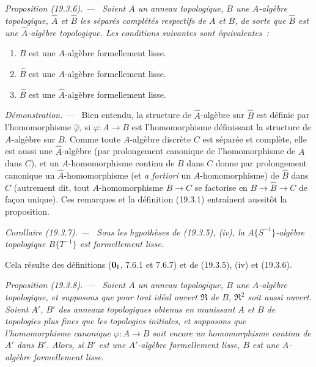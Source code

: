\documentclass[10pt,oneside]{book}
\makeatletter
\newcommand{\setmanualcurrentlabel}[1]{\def\@currentlabel{#1}}
\newcommand{\oldpage}[2][]{%
  \setcounter{footnote}{0}%
  \marginpar{\scriptsize\textbf{#1}~|~#2}\ignorespaces}
\newenvironment{proposition}[1][]{%
  \setmanualcurrentlabel{#1}\par\medskip\noindent\itshape Proposition (#1). ---\ }{\par}
\newenvironment{corollary}[1][]{%
  \setmanualcurrentlabel{#1}\par\medskip\noindent\itshape Corollaire (#1). ---\ }{\par}
\newenvironment{proof}{%
  \par\medskip\noindent\textit{Démonstration. ---\ }}{\par}
\makeatother
\begin{document}
\oldpage[0\textsubscript{IV-1}]{83}

\begin{proposition}[19.3.6]
\label{0.19.3.6-fr}
Soient $A$ un anneau topologique, $B$ une $A$-algèbre topologique, $\hat A$
et $\hat B$ les séparés complétés respectifs de $A$ et $B$, de sorte que
$\hat B$ est une $\hat A$-algèbre topologique. Les conditions suivantes
sont équivalentes~:
\begin{enumerate}
  \item[a)] $B$ est une $A$-algèbre formellement lisse.
  \item[b)] $\hat B$ est une $A$-algèbre formellement lisse.
  \item[c)] $\hat B$ est une $\hat A$-algèbre formellement lisse.
\end{enumerate}
\end{proposition}

\begin{proof}
Bien entendu, la structure de $\hat A$-algèbre sur $\hat B$ est définie
par l'homomorphisme $\hat\varphi$, si $\varphi:A\to B$ est
l'homomorphisme définissant la structure de $A$-algèbre sur $B$. Comme toute
$A$-algèbre discrète $C$ est séparée et complète, elle est aussi une
$\hat A$-algèbre (par prolongement canonique de l'homomorphisme de $A$ dans
$C$), et un $A$-homomorphisme continu de $B$ dans $C$ donne par prolongement
canonique un $\hat A$-homomorphisme (et \emph{a fortiori} un
$A$-homomorphisme) de $\hat B$ dans $C$ (autrement dit, tout
$A$-homomorphisme $B\to C$ se factorise en $B\to\hat B\to C$ de façon
unique). Ces remarques et la définition (19.3.1) entraînent aussitôt la
proposition.
\end{proof}

\begin{corollary}[19.3.7]
\label{0.19.3.7-fr}
Sous les hypothèses de (19.3.5), (iv), la $A\{S^{-1}\}$-algèbre topologique
$B\{T^{-1}\}$ est formellement lisse.
\end{corollary}

Cela résulte des définitions ($\mathbf 0_{\rm I}$, 7.6.1 et 7.6.7) et de
(19.3.5), (iv) et (19.3.6).

\begin{proposition}[19.3.8]
\label{0.19.3.8-fr}
Soient $A$ un anneau topologique, $B$ une $A$-algèbre topologique, et supposons
que pour tout idéal ouvert $\mathfrak R$ de $B$, $\mathfrak R^2$ soit aussi
ouvert. Soient $A'$, $B'$ des anneaux topologiques obtenus en munissant $A$ et
$B$ de topologies plus fines que les topologies initiales, et supposons que
l'homomorphisme canonique $\varphi:A\to B$ soit encore un homomorphisme
continu de $A'$ dans $B'$. Alors, si $B'$ est une $A'$-algèbre formellement
lisse, $B$ est une $A$-algèbre formellement lisse.
\end{proposition}
\end{document}
